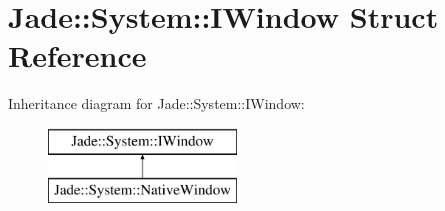 \hypertarget{struct_jade_1_1_system_1_1_i_window}{}\section{Jade\+:\+:System\+:\+:I\+Window Struct Reference}
\label{struct_jade_1_1_system_1_1_i_window}
Inheritance diagram for Jade\+:\+:System\+:\+:I\+Window\+:\begin{figure}[H]
\begin{center}
\leavevmode
\includegraphics[height=2.000000cm]{struct_jade_1_1_system_1_1_i_window}
\end{center}
\end{figure}
